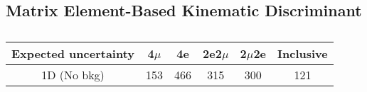 \subsection{Matrix Element-Based Kinematic Discriminant}

\begin{table}[ht]
    \begin{center}
    \begin{tabular}{|c|cccc|c|}
    \hline			
    Expected uncertainty	&	4$\mu$	&	4e	&	2e2$\mu$	&2$\mu$2e	& Inclusive	\\
    \hline			
        1D	(No bkg) &	153	&	466	&	315	&	300	&	121	\\
    \hline
    \end{tabular}
    \end{center}
    \caption{
        }
    \label{table:model_result_fs_1D}
    \end{table}
    
